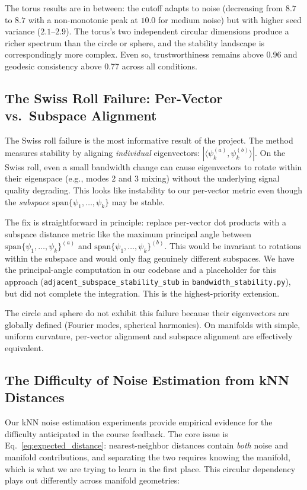 \documentclass{article}
\begin{document}
The torus results are in between: the cutoff adapts to noise (decreasing from $8.7$ to $8.7$ with a non-monotonic peak at $10.0$ for medium noise) but with higher seed variance ($2.1$--$2.9$). The torus's two independent circular dimensions produce a richer spectrum than the circle or sphere, and the stability landscape is correspondingly more complex. Even so, trustworthiness remains above 0.96 and geodesic consistency above 0.77 across all conditions.

\subsection{The Swiss Roll Failure: Per-Vector vs.\ Subspace Alignment}

The Swiss roll failure is the most informative result of the project. The method measures stability by aligning \emph{individual} eigenvectors: $|\langle \psi_k^{(a)}, \psi_k^{(b)} \rangle|$. On the Swiss roll, even a small bandwidth change can cause eigenvectors to rotate within their eigenspace (e.g., modes 2 and 3 mixing) without the underlying signal quality degrading. This looks like instability to our per-vector metric even though the \emph{subspace} $\mathrm{span}\{\psi_1, \ldots, \psi_k\}$ may be stable.

The fix is straightforward in principle: replace per-vector dot products with a subspace distance metric like the maximum principal angle between $\mathrm{span}\{\psi_1, \ldots, \psi_k\}^{(a)}$ and $\mathrm{span}\{\psi_1, \ldots, \psi_k\}^{(b)}$. This would be invariant to rotations within the subspace and would only flag genuinely different subspaces. We have the principal-angle computation in our codebase and a placeholder for this approach (\texttt{adjacent\_subspace\_stability\_stub} in \texttt{bandwidth\_stability.py}), but did not complete the integration. This is the highest-priority extension.

The circle and sphere do not exhibit this failure because their eigenvectors are globally defined (Fourier modes, spherical harmonics). On manifolds with simple, uniform curvature, per-vector alignment and subspace alignment are effectively equivalent.

\subsection{The Difficulty of Noise Estimation from kNN Distances}

Our kNN noise estimation experiments provide empirical evidence for the difficulty anticipated in the course feedback. The core issue is Eq.~\eqref{eq:expected_distance}: nearest-neighbor distances contain \emph{both} noise and manifold contributions, and separating the two requires knowing the manifold, which is what we are trying to learn in the first place. This circular dependency plays out differently across manifold geometries:
\end{document}
